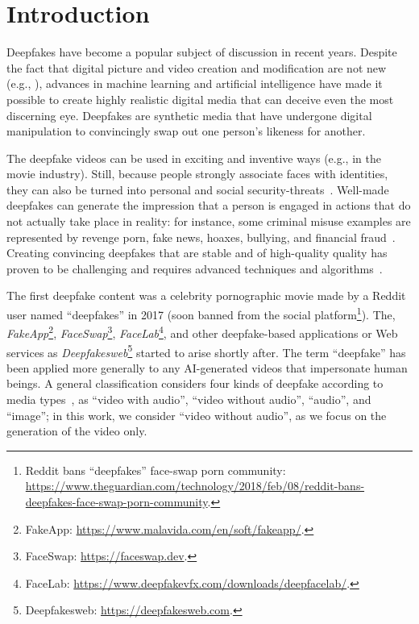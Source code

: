 \documentclass[sn-mathphys,Numbered]{sn-jnl}
\theoremstyle{thmstyleone}%
\theoremstyle{thmstyletwo}%
\theoremstyle{thmstylethree}%
\begin{document}
\section{Introduction}\label{sec:intro}
Deepfakes have become a popular subject of discussion in recent years. 
Despite the fact that digital picture and video creation and modification are not new (e.g., \cite{farid}), advances in machine learning and artificial intelligence have made it possible to create highly realistic digital media that can deceive even the most discerning eye. Deepfakes are synthetic media that have undergone digital manipulation to convincingly swap out one person's likeness for another.

The deepfake videos can be used in exciting and inventive ways (e.g., in the movie industry). Still, because people strongly associate faces with  identities, they can also be turned into personal and social security-threats~\cite{securitythreat}. Well-made deepfakes  can generate the impression that a person is  engaged in actions that do not actually take place in reality: for instance, some criminal misuse examples are represented by revenge porn, fake news, hoaxes, bullying, and financial fraud~\cite{financialfraud}.
Creating convincing deepfakes that are stable and of high-quality quality has proven  to be challenging and requires advanced techniques and algorithms~\cite{survey2}. 

The first deepfake content was a celebrity pornographic movie made by a Reddit user named ``deepfakes'' in 2017 (soon banned from the social platform\footnote{Reddit bans ``deepfakes'' face-swap porn community: \url{https://www.theguardian.com/technology/2018/feb/08/reddit-bans-deepfakes-face-swap-porn-community}.}). The, \emph{FakeApp}\footnote{FakeApp: \url{https://www.malavida.com/en/soft/fakeapp/}.}, \emph{FaceSwap}\footnote{FaceSwap: \url{https://faceswap.dev}.}, \emph{FaceLab}\footnote{FaceLab: \url{https://www.deepfakevfx.com/downloads/deepfacelab/}.}, and other deepfake-based applications or Web services as \emph{Deepfakesweb}\footnote{Deepfakesweb: \url{https://deepfakesweb.com}.} started to arise shortly after. 
The term ``deepfake'' has been applied more generally to any AI-generated videos that impersonate human beings.
A general classification considers  four kinds of deepfake according to media types~\cite{surveydet}, as ``video with audio'', ``video without audio'', ``audio'', and ``image''; in this work, we consider ``video without audio'', as we focus on the generation of the video only.
\end{document}
